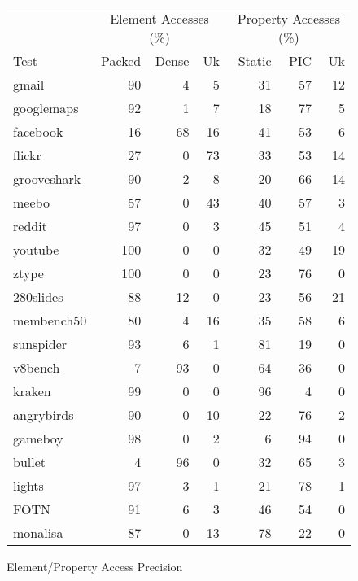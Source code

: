 \begin{figure}
\begin{center}
\begin{tabular}{lrrrrrr}
\toprule
     & \multicolumn{3}{c}{Element Accesses (\%)}
     & \multicolumn{3}{c}{Property Accesses (\%)} \\
\cmidrule(r){2-4}
\cmidrule{5-7}
Test & Packed & Dense & Uk
     & Static & PIC & Uk \\
\midrule
gmail          & 90 & 4 & 5 & 31 & 57 & 12 \\
googlemaps     & 92 & 1 & 7 & 18 & 77 & 5 \\
facebook       & 16 & 68 & 16 & 41 & 53 & 6 \\
flickr         & 27 & 0 & 73 & 33 & 53 & 14 \\
grooveshark    & 90 & 2 & 8 & 20 & 66 & 14 \\
meebo          & 57 & 0 & 43 & 40 & 57 & 3 \\
reddit         & 97 & 0 & 3 & 45 & 51 & 4 \\
youtube        & 100 & 0 & 0 & 32 & 49 & 19 \\
ztype          & 100 & 0 & 0 & 23 & 76 & 0 \\
280slides      & 88 & 12 & 0 & 23 & 56 & 21 \\
membench50     & 80 & 4 & 16 & 35 & 58 & 6 \\
\midrule
sunspider      & 93 & 6 & 1 & 81 & 19 & 0 \\
v8bench        & 7 & 93 & 0 & 64 & 36 & 0 \\
kraken         & 99 & 0 & 0 & 96 & 4 & 0 \\
\midrule
angrybirds     & 90 & 0 & 10 & 22 & 76 & 2 \\
gameboy        & 98 & 0 & 2 & 6 & 94 & 0 \\
bullet         & 4 & 96 & 0 & 32 & 65 & 3 \\
lights         & 97 & 3 & 1 & 21 & 78 & 1 \\
FOTN           & 91 & 6 & 3 & 46 & 54 & 0 \\
monalisa       & 87 & 0 & 13 & 78 & 22 & 0 \\
\bottomrule
\end{tabular}
\end{center}
\nocaptionrule \caption{Element/Property Access Precision}
\end{figure}

